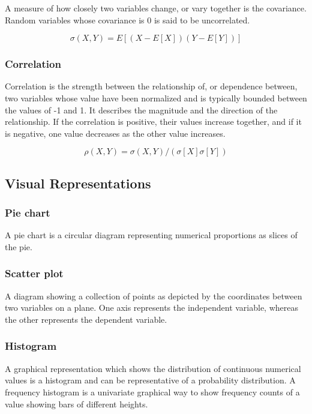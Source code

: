 \documentclass[11pt,a4paper]{article}
\begin{document}
A measure of how closely two variables change, or vary together is the
covariance. Random variables whose covariance is 0 is said to be
uncorrelated.

\[ \sigma(X, Y) = E[(X - E[X])(Y-E[Y])] \]

\subsubsection{Correlation}\label{correlation}

Correlation is the strength between the relationship of, or dependence
between, two variables whose value have been normalized and is typically
bounded between the values of -1 and 1. It describes the magnitude and
the direction of the relationship. If the correlation is positive, their
values increase together, and if it is negative, one value decreases as
the other value increases.

\[ \rho(X, Y) = \sigma(X, Y) / (\sigma [X] \sigma [Y]) \]

\subsection{Visual Representations}\label{visual-representations}

\subsubsection{Pie chart}\label{pie-chart}

A pie chart is a circular diagram representing numerical proportions as
slices of the pie.

\subsubsection{Scatter plot}\label{scatter-plot}

A diagram showing a collection of points as depicted by the coordinates
between two variables on a plane. One axis represents the independent
variable, whereas the other represents the dependent variable.

\subsubsection{Histogram}\label{histogram}

A graphical representation which shows the distribution of continuous
numerical values is a histogram and can be representative of a
probability distribution. A frequency histogram is a univariate
graphical way to show frequency counts of a value showing bars of
different heights.
\end{document}
